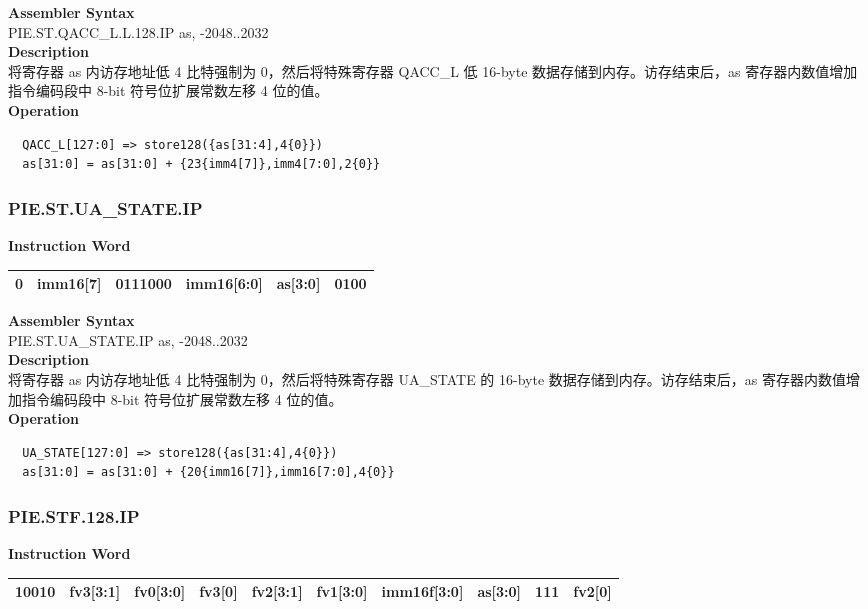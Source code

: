 \textbf{Assembler Syntax} \\
PIE.ST.QACC\_L.L.128.IP as, -2048..2032 \\
\textbf{Description} \\
将寄存器 as 内访存地址低 4 比特强制为 0，然后将特殊寄存器 QACC\_L 低 16-byte 数据存储到内存。访存结束后，as 寄存器内数值增加指令编码段中 8-bit 符号位扩展常数左移 4 位的值。\\
\textbf{Operation}
\begin{lstlisting}
  QACC_L[127:0] => store128({as[31:4],4{0}})
  as[31:0] = as[31:0] + {23{imm4[7]},imm4[7:0],2{0}}
\end{lstlisting}

\newpage
\subsubsection{PIE.ST.UA\_STATE.IP}\label{instruction:PIESTUASTATEIP}
\setlength\tabcolsep{6pt}
\textbf{Instruction Word} \\
\begin{tabular}{|c|c|c|c|c|c|}
	\hline
	0 & imm16[7] & 0111000 & imm16[6:0] & as[3:0] & 0100 \\
	\hline
\end{tabular}

\textbf{Assembler Syntax} \\
PIE.ST.UA\_STATE.IP as, -2048..2032 \\
\textbf{Description} \\
将寄存器 as 内访存地址低 4 比特强制为 0，然后将特殊寄存器 UA\_STATE 的 16-byte 数据存储到内存。访存结束后，as 寄存器内数值增加指令编码段中 8-bit 符号位扩展常数左移 4 位的值。\\
\textbf{Operation}
\begin{lstlisting}
  UA_STATE[127:0] => store128({as[31:4],4{0}})
  as[31:0] = as[31:0] + {20{imm16[7]},imm16[7:0],4{0}}
\end{lstlisting}

\newpage
\subsubsection{PIE.STF.128.IP}\label{instruction:PIESTF128IP}
\setlength\tabcolsep{6pt}
\textbf{Instruction Word} \\
\begin{tabular}{|c|c|c|c|c|c|c|c|c|c|}
	\hline
	10010 & fv3[3:1] & fv0[3:0] & fv3[0] & fv2[3:1] & fv1[3:0] & imm16f[3:0] & as[3:0] & 111 & fv2[0] \\
	\hline
\end{tabular}

